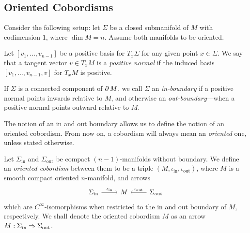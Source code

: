 \subsection{Oriented Cobordisms}

Consider the following setup: let \(\Sigma\) be a closed submanifold of \(M\)
with codimension \(1\), where \(\dim M = n\). Assume both manifolds to be
oriented.

\begin{definition}
\label{def:positive-normal-manifold}
Let \([v_1, \dots, v_{n-1}]\) be a positive basis for \(T_x \Sigma\) for any
given point \(x \in \Sigma\). We say that a tangent vector \(v \in T_x M\) is a
\emph{positive normal} if the induced basis \([v_1, \dots, v_{n-1}, v]\) for
\(T_x M\) is positive.
\end{definition}

\begin{definition}
\label{def:in-out-boundaries}
If \(\Sigma\) is a connected component of \(\operatorname{\partial} M\), we call \(\Sigma\) an
\emph{in-boundary} if a positive normal points inwards relative to \(M\), and
otherwise an \emph{out-boundary}---when a positive normal points outward
relative to \(M\).
\end{definition}


The notion of an in and out boundary allows us to define the notion of an
oriented cobordism. From now on, a cobordism will always mean an
\emph{oriented} one, unless stated otherwise.

\begin{definition}
\label{def:oriented-cobordism}
Let \(\Sigma_{\text{in}}\) and \(\Sigma_{\text{out}}\) be compact
\((n-1)\)-manifolds without boundary. We define an \emph{oriented cobordism}
between them to be a triple \((M, \iota_{\text{in}}, \iota_{\text{out}})\),
where \(M\) is a smooth compact oriented \(n\)-manifold, and arrows
\[
\begin{tikzcd}
\Sigma_{\text{in}} \ar[r, "\iota_{\text{in}}"] &M
&\Sigma_{\text{out}} \ar[l, "\iota_{\text{out}}"']
\end{tikzcd}
\]
which are \(C^{\infty}\)-isomorphisms when restricted to the in and out boundary
of \(M\), respectively. We shall denote the oriented cobordism \(M\) as an
arrow \(M: \Sigma_{\text{in}} \Rightarrow \Sigma_{\text{out}}\).
\end{definition}


